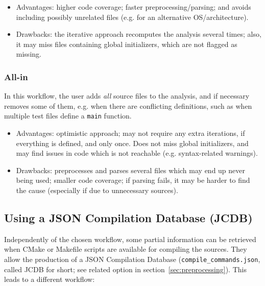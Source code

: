 \begin{itemize}
\item Advantages: higher code coverage; faster preprocessing/parsing; and
avoids including possibly unrelated files
(e.g. for an alternative OS/architecture).
\item Drawbacks: the iterative approach recomputes the analysis several times;
  also, it may miss files containing global initializers, which are not flagged
  as missing.
\end{itemize}

\subsubsection{All-in}

In this workflow, the user adds {\em all} source files to the analysis, and
if necessary removes some of them, e.g. when there are conflicting definitions,
such as when multiple test files define a \texttt{main} function.

\begin{itemize}
\item Advantages: optimistic approach; may not require any extra iterations, if
  everything is defined, and only once. Does not miss global initializers, and
  may find issues in code which is not reachable (e.g. syntax-related warnings).
\item Drawbacks: preprocesses and parses several files which may end up never
  being used; smaller code coverage; if parsing fails, it may be harder to
  find the cause (especially if due to unnecessary sources).
\end{itemize}

\subsection{Using a JSON Compilation Database (JCDB)}

Independently of the chosen workflow, some partial information can be retrieved
when CMake or Makefile scripts are available for compiling the sources.
They allow the production of a JSON Compilation Database
(\texttt{compile\_commands.json}, called JCDB for short; see related option
in section~\ref{sec:preprocessing}). This leads to a different workflow:


